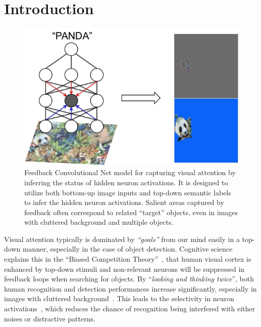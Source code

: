 \section{Introduction}

\begin{center}
\end{center}

\setlength{\tabcolsep}{2pt}
\begin{figure}[htb]
\begin{center}
\includegraphics[width=0.9\columnwidth]{figs/splash0/splash}
\caption{Feedback Convolutional Net model for capturing visual attention by inferring the status of hidden neuron activations. It is designed to utilize both bottom-up image inputs and top-down semantic labels to infer the hidden neuron activations. Salient areas captured by feedback often correspond to related ``target'' objects, even in images with cluttered background and multiple objects.}
\label{fig:splash0}
\end{center}
\end{figure}

Visual attention typically is dominated by \emph{``goals''} from our mind easily in a top-down manner, especially in the case of object detection. Cognitive science explains this in the ``Biased Competition Theory''~\cite{beck2009top,desimone1998visual,desimone1995neural}, that human visual cortex is enhanced by top-down stimuli and non-relevant neurons will be suppressed in feedback loops when searching for objects. By ``\emph{looking and thinking twice}'', both human recognition and detection performances increase significantly, especially in images with cluttered background~\cite{Cichy2014Resolving}. This leads to the selectivity in neuron activations~\cite{Kruger2013Deep}, which reduces the chance of recognition being interfered with either noises or distractive patterns.

